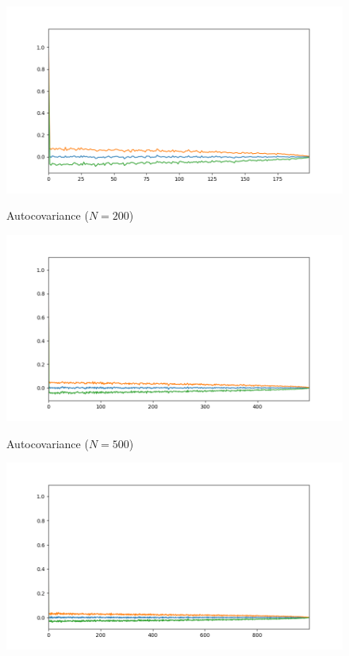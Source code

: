 \documentclass[11pt]{article}
\begin{document}
\begin{exercise}
\begin{figure}
    \centering
    \begin{minipage}[t]{0.3\textwidth}
    \centerline{\includegraphics[width=\textwidth]{Assignment 1 - ML for TS (MVA 2023-2024)/mean_sample_autocorrelation_N=200.png}}
    \centerline{Autocovariance ($N=200$)}
    \end{minipage}
    \begin{minipage}[t]{0.3\textwidth}
    \centerline{\includegraphics[width=\textwidth]{Assignment 1 - ML for TS (MVA 2023-2024)/mean_sample_autocorrelation_N=500.png}}
    \centerline{Autocovariance ($N=500$)}
    \end{minipage}
    \begin{minipage}[t]{0.3\textwidth}
    \centerline{\includegraphics[width=\textwidth]{Assignment 1 - ML for TS (MVA 2023-2024)/mean_sample_autocorrelation_N=1000.png}}

\end{minipage}
\end{figure}
\end{exercise}
\end{document}
